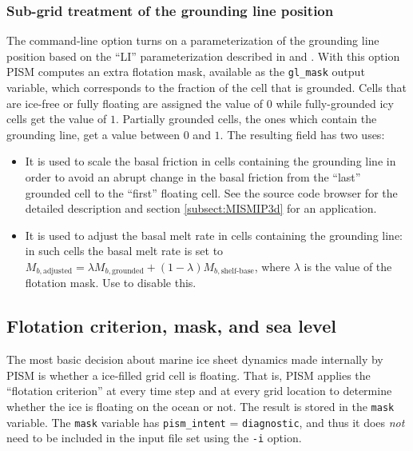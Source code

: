 \subsubsection{Sub-grid treatment of the grounding line position}
\label{subsec:subgrid-grounding-line}

The command-line option  turns on a parameterization of the grounding line position based on the ``LI'' parameterization described in \cite{Gladstoneetal2010} and \cite{Feldmannetal2014}.  With this option PISM computes an extra flotation mask, available as the \texttt{gl_mask} output variable, which corresponds to the fraction of the cell that is grounded.  Cells that are ice-free or fully floating are assigned the value of $0$ while fully-grounded icy cells get the value of $1$.  Partially grounded cells, the ones which contain the grounding line, get a value between $0$ and $1$.  The resulting field has two uses:
\begin{itemize}
\item It is used to scale the basal friction in cells containing the grounding line in order to avoid an abrupt change in the basal friction from the ``last'' grounded cell to the ``first'' floating cell.  See the source code browser for the detailed description and section \ref{subsect:MISMIP3d} for an application.
\item It is used to adjust the basal melt rate in cells containing the grounding line: in such cells the basal melt rate is set to $M_{b,\text{adjusted}} = \lambda M_{b,\text{grounded}} + (1 - \lambda)M_{b,\text{shelf-base}}$, where $\lambda$ is the value of the flotation mask. Use  to disable this.
\end{itemize}


\subsection{Flotation criterion, mask, and sea level}
\label{sec:floatmask}

The most basic decision about marine ice sheet dynamics made internally by PISM is whether a ice-filled grid cell is floating.  That is, PISM applies the ``flotation criterion'' \cite{Winkelmannetal2011} at every time step and at every grid location to determine whether the ice is floating on the ocean or not.  The result is stored in the \texttt{mask} variable.  The \texttt{mask} variable has \texttt{pism_intent} = \texttt{diagnostic}, and thus it does \emph{not} need to be included in the input file set using the \texttt{-i} option.

